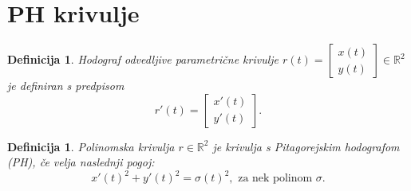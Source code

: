 \documentclass[12pt]{article}
\newtheorem{Definicija}[Izrek]{{\sc Definicija}}
\begin{document}
\section{PH krivulje}

\begin{Definicija}
	
	Hodograf odvedljive parametrične krivulje $r (t) = \begin{bmatrix} x(t) \\ y(t) \end{bmatrix} \in \mathbb{R}^2$ 
	je definiran s predpisom $$r'(t) = \begin{bmatrix} x'(t) \\ y'(t) \end{bmatrix}.$$
\end{Definicija}
\begin{Definicija}
	Polinomska krivulja $r \in \mathbb{R}^2$ je krivulja s Pitagorejskim hodografom (PH), če velja naslednji pogoj:
	$$x'(t)^2 + y'(t)^2 = \sigma(t)^2, \text{ za nek polinom } \sigma.$$
\end{Definicija}
\end{document}
